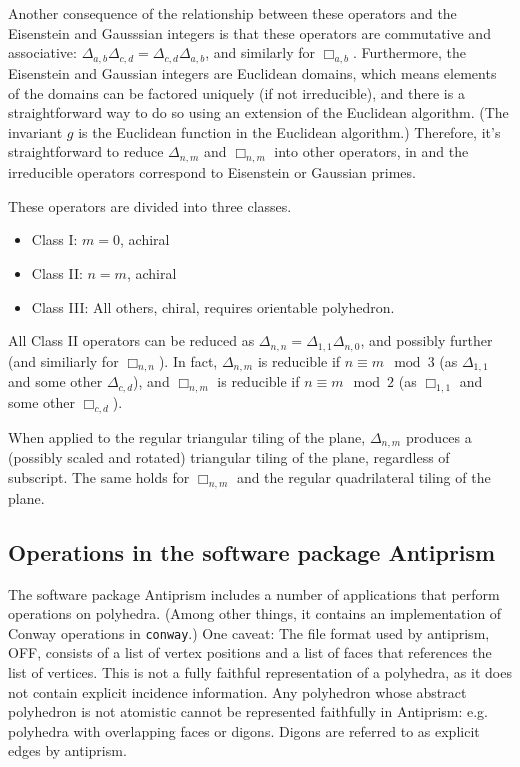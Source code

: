 \documentclass[12pt]{amsart}%
\begin{document}
Another consequence of the relationship between these operators and the
Eisenstein and Gausssian integers is that these operators are commutative and
associative: $\Delta_{a,b}\Delta_{c,d} = \Delta_{c,d}\Delta_{a,b}$, and
similarly for $\Box_{a,b}$. Furthermore, the Eisenstein and Gaussian integers
are Euclidean domains, which means elements of the domains can be factored
uniquely (if not irreducible), and there is a straightforward way to do so
using an extension of the Euclidean algorithm. (The invariant $g$ is the
Euclidean function in the Euclidean algorithm.) Therefore, it's straightforward
to reduce $\Delta_{n,m}$ and $\Box_{n,m}$ into other operators, in
and the irreducible operators correspond to Eisenstein or Gaussian primes.

These operators are divided into three classes.
\begin{itemize}
  \item Class I: $m = 0$, achiral
  \item Class II: $n = m$, achiral
  \item Class III: All others, chiral, requires orientable polyhedron.
\end{itemize}
All Class II operators can be reduced as
$\Delta_{n,n} = \Delta_{1,1}\Delta_{n,0}$, and possibly further (and similiarly
for $\Box_{n,n}$). In fact, $\Delta_{n,m}$ is reducible if $n \equiv m \mod 3$
(as $\Delta_{1,1}$ and some other $\Delta_{c,d}$), and $\Box_{n,m}$ is
reducible if $n \equiv m \mod 2$ (as $\Box_{1,1}$ and some other $\Box_{c,d}$).

When applied to the regular triangular tiling of the plane, $\Delta_{n,m}$
produces a (possibly scaled and rotated) triangular tiling of the plane,
regardless of subscript. The same holds for $\Box_{n,m}$ and the regular
quadrilateral tiling of the plane.

\subsection{Operations in the software package Antiprism}

The software package Antiprism \cite{antiprism} includes a number of
applications that perform operations on polyhedra. (Among other things, it
contains an implementation of Conway operations in \texttt{conway}.) One
caveat: The file format used by antiprism, OFF, consists of a list of vertex
positions and a list of faces that references the list of vertices. This is
not a fully faithful representation of a polyhedra, as it does not contain
explicit incidence information. Any polyhedron whose abstract polyhedron is
not atomistic cannot be represented faithfully in Antiprism: e.g. polyhedra
with overlapping faces or digons. Digons are referred to as explicit edges by
antiprism.
\end{document}
